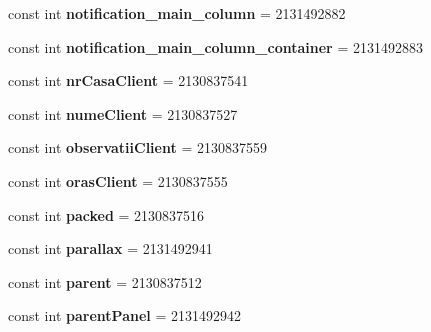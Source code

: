\begin{DoxyCompactItemize}
const int {\bfseries notification\+\_\+main\+\_\+column} = 2131492882
\item 
\mbox{\label{classst_delivery_1_1_resource_1_1_id_a178a0b79603054d8bfffb00c251ddf9a}} 
const int {\bfseries notification\+\_\+main\+\_\+column\+\_\+container} = 2131492883
\item 
\mbox{\label{classst_delivery_1_1_resource_1_1_id_a7538a1e22c857fb536332c4672df9e68}} 
const int {\bfseries nr\+Casa\+Client} = 2130837541
\item 
\mbox{\label{classst_delivery_1_1_resource_1_1_id_a3681392db3465a50188c6efdeca39069}} 
const int {\bfseries nume\+Client} = 2130837527
\item 
\mbox{\label{classst_delivery_1_1_resource_1_1_id_a5371b9ad37f5ebb5134b168c79944125}} 
const int {\bfseries observatii\+Client} = 2130837559
\item 
\mbox{\label{classst_delivery_1_1_resource_1_1_id_a8108d0f673ddedbaf6c54cc0459d3322}} 
const int {\bfseries oras\+Client} = 2130837555
\item 
\mbox{\label{classst_delivery_1_1_resource_1_1_id_a67dbb92ff8d33f713f8fd75078bac607}} 
const int {\bfseries packed} = 2130837516
\item 
\mbox{\label{classst_delivery_1_1_resource_1_1_id_a0c8c2d68d7da6038172581f4d4fe53c7}} 
const int {\bfseries parallax} = 2131492941
\item 
\mbox{\label{classst_delivery_1_1_resource_1_1_id_a857e355e6bc61230dcfef962791a5ef6}} 
const int {\bfseries parent} = 2130837512
\item 
\mbox{\label{classst_delivery_1_1_resource_1_1_id_a7fb0acd7c1765fea4231915ef6473a2c}} 
const int {\bfseries parent\+Panel} = 2131492942
\item 
\mbox{\label{classst_delivery_1_1_resource_1_1_id_a6f3403291377ce1a6edbbab48802028e}} 

\end{DoxyCompactItemize}
